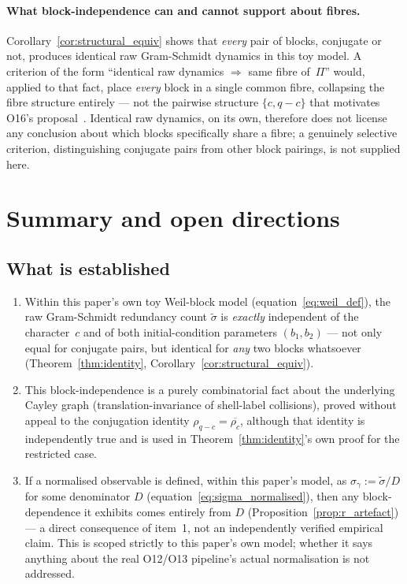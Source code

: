 \documentclass[11pt,a4paper]{article}
\theoremstyle{definition}
\begin{document}
  \paragraph{What block-independence can and cannot support about fibres.}
    Corollary~\ref{cor:structural_equiv} shows that \emph{every} pair of
    blocks, conjugate or not, produces identical raw Gram-Schmidt dynamics
    in this toy model.
    A criterion of the form ``identical raw dynamics $\Rightarrow$ same
    fibre of~$\Pi$'' would, applied to that fact, place \emph{every} block
    in a single common fibre, collapsing the fibre structure entirely ---
    not the pairwise structure $\{c,q-c\}$ that motivates O16's
    proposal~\cite{Beau2026a20}.
    Identical raw dynamics, on its own, therefore does not license any
    conclusion about which blocks specifically share a fibre; a
    genuinely selective criterion, distinguishing conjugate pairs from
    other block pairings, is not supplied here.

  \section{Summary and open directions}
  \label{sec:summary}

  \subsection{What is established}

    \begin{enumerate}
      \item Within this paper's own toy Weil-block model
      (equation~\eqref{eq:weil_def}), the raw Gram-Schmidt redundancy
      count $\tilde\sigma$ is \emph{exactly} independent of the
      character~$c$ and of both initial-condition parameters $(b_1,b_2)$
      --- not only equal for conjugate pairs, but identical for
      \emph{any} two blocks whatsoever
      (Theorem~\ref{thm:identity}, Corollary~\ref{cor:structural_equiv}).

      \item This block-independence is a purely combinatorial fact about
      the underlying Cayley graph (translation-invariance of shell-label
      collisions), proved without appeal to the conjugation identity
      $\rho_{q-c}=\overline{\rho_c}$, although that identity is
      independently true and is used in Theorem~\ref{thm:identity}'s own
      proof for the restricted case.

      \item If a normalised observable is defined, within this paper's
      model, as $\sigma_\gamma := \tilde\sigma/D$ for some denominator
      $D$ (equation~\eqref{eq:sigma_normalised}), then any block-dependence
      it exhibits comes entirely from $D$
      (Proposition~\ref{prop:r_artefact}) --- a direct consequence of
      item~1, not an independently verified empirical claim.
      This is scoped strictly to this paper's own model; whether it says
      anything about the real O12/O13 pipeline's actual normalisation is
      not addressed.
    \end{enumerate}
\end{document}
